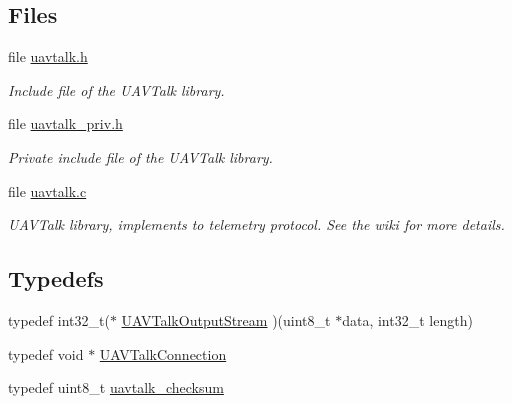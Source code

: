 \subsection*{\-Files}
\begin{DoxyCompactItemize}
\item 
file \hyperlink{uavtalk_8h}{uavtalk.\-h}
\begin{DoxyCompactList}\small\item\em \-Include file of the \-U\-A\-V\-Talk library. \end{DoxyCompactList}\item 
file \hyperlink{uavtalk__priv_8h}{uavtalk\-\_\-priv.\-h}
\begin{DoxyCompactList}\small\item\em \-Private include file of the \-U\-A\-V\-Talk library. \end{DoxyCompactList}\item 
file \hyperlink{uavtalk_8c}{uavtalk.\-c}
\begin{DoxyCompactList}\small\item\em \-U\-A\-V\-Talk library, implements to telemetry protocol. \-See the wiki for more details. \end{DoxyCompactList}\end{DoxyCompactItemize}
\subsection*{\-Typedefs}
\begin{DoxyCompactItemize}
\item 
typedef int32\-\_\-t($\ast$ \hyperlink{group___u_a_v_talk_ga0c67fb4d23157d56fe1982e4788938c7}{\-U\-A\-V\-Talk\-Output\-Stream} )(uint8\-\_\-t $\ast$data, int32\-\_\-t length)
\item 
typedef void $\ast$ \hyperlink{group___u_a_v_talk_gaeff1721eaebd4ab306057b4017f23f36}{\-U\-A\-V\-Talk\-Connection}
\item 
typedef uint8\-\_\-t \hyperlink{group___u_a_v_talk_gad5ae4f5e5aa19ffb6f8e688a448e9618}{uavtalk\-\_\-checksum}
\end{DoxyCompactItemize}
